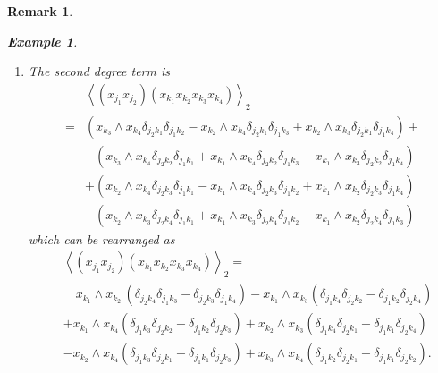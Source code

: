 \documentclass[aps,preprint]{revtex4}%
\newtheorem{example}[theorem]{Example}
\newtheorem{remark}[theorem]{Remark}
\begin{document}
\begin{remark}
\begin{example}
\begin{enumerate}
\item The second degree term is
\begin{align}
&  \left\langle \left(  x_{j_{1}}x_{j_{2}}\right)  \left(  x_{k_{1}}x_{k_{2}%
}x_{k_{3}}x_{k_{4}}\right)  \right\rangle _{2}\\
=  &  \left(  x_{k_{3}}\wedge x_{k_{4}}\delta_{j_{2}k_{1}}\delta_{j_{1}k_{2}%
}-x_{k_{2}}\wedge x_{k_{4}}\delta_{j_{2}k_{1}}\delta_{j_{1}k_{3}}+x_{k_{2}%
}\wedge x_{k_{3}}\delta_{j_{2}k_{1}}\delta_{j_{1}k_{4}}\right)  +\\
&  -\left(  x_{k_{3}}\wedge x_{k_{4}}\delta_{j_{2}k_{2}}\delta_{j_{1}k_{1}%
}+x_{k_{1}}\wedge x_{k_{4}}\delta_{j_{2}k_{2}}\delta_{j_{1}k_{3}}-x_{k_{1}%
}\wedge x_{k_{3}}\delta_{j_{2}k_{2}}\delta_{j_{1}k_{4}}\right) \\
&  +\left(  x_{k_{2}}\wedge x_{k_{4}}\delta_{j_{2}k_{3}}\delta_{j_{1}k_{1}%
}-x_{k_{1}}\wedge x_{k_{4}}\delta_{j_{2}k_{3}}\delta_{j_{1}k_{2}}+x_{k_{1}%
}\wedge x_{k_{2}}\delta_{j_{2}k_{3}}\delta_{j_{1}k_{4}}\right) \\
&  -\left(  x_{k_{2}}\wedge x_{k_{3}}\delta_{j_{2}k_{4}}\delta_{j_{1}k_{1}%
}+x_{k_{1}}\wedge x_{k_{3}}\delta_{j_{2}k_{4}}\delta_{j_{1}k_{2}}-x_{k_{1}%
}\wedge x_{k_{2}}\delta_{j_{2}k_{4}}\delta_{j_{1}k_{3}}\right)
\end{align}
which can be rearranged as
\begin{align}
&  \left\langle \left(  x_{j_{1}}x_{j_{2}}\right)  \left(  x_{k_{1}}x_{k_{2}%
}x_{k_{3}}x_{k_{4}}\right)  \right\rangle _{2}=\nonumber\\
&  \quad x_{k_{1}}\wedge x_{k_{2}}\,\left(  \delta_{j_{2}k_{4}}\delta
_{j_{1}k_{3}}-\delta_{j_{2}k_{3}}\delta_{j_{1}k_{4}}\right)  -x_{k_{1}}\wedge
x_{k_{3}}\left(  \delta_{j_{1}k_{4}}\delta_{j_{2}k_{2}}-\delta_{j_{1}k_{2}%
}\delta_{j_{2}k_{4}}\right) \\
&  +x_{k_{1}}\wedge x_{k_{4}}\left(  \delta_{j_{1}k_{3}}\delta_{j_{2}k_{2}%
}-\delta_{j_{1}k_{2}}\delta_{j_{2}k_{3}}\right)  +x_{k_{2}}\wedge x_{k_{3}%
}\left(  \delta_{j_{1}k_{4}}\delta_{j_{2}k_{1}}-\delta_{j_{1}k_{1}}%
\delta_{j_{2}k_{4}}\right) \\
&  -x_{k_{2}}\wedge x_{k_{4}}\left(  \delta_{j_{1}k_{3}}\delta_{j_{2}k_{1}%
}-\delta_{j_{1}k_{1}}\delta_{j_{2}k_{3}}\right)  +x_{k_{3}}\wedge x_{k_{4}%
}\left(  \delta_{j_{1}k_{2}}\delta_{j_{2}k_{1}}-\delta_{j_{1}k_{1}}%
\delta_{j_{2}k_{2}}\right)  .
\end{align}



\end{enumerate}
\end{example}
\end{remark}
\end{document}
